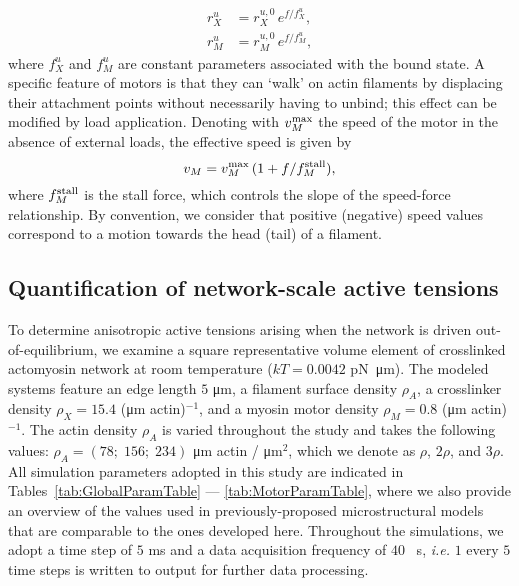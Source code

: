 \begin{equation}\label{eq:BellsLaw}
	\begin{aligned}
		r_X^{u} &= r_X^{u,0} \, e^{f / f_X^u} , \\
		r_M^{u} &= r_M^{u,0} \, e^{f / f_M^u} ,
	\end{aligned}
\end{equation}
where $f_X^u$ and $f_M^u$ are constant parameters associated with the bound state. A specific feature of motors is that they can `walk' on actin filaments by displacing their attachment points without necessarily having to unbind; this effect can be modified by load application. Denoting with $v_M^{\rm max}$ the speed of the motor in the absence of external loads, the effective speed is given by
\begin{equation}\label{eq:MotorSpeed}
	v_M = v_M^{\rm max} \, (1 + f / f_M^{\rm stall}) ,
\end{equation}
where $f_M^{\rm stall}$ is the stall force, which controls the slope of the speed-force relationship. By convention, we consider that positive (negative) speed values correspond to a motion towards the head (tail) of a filament.



\subsection{\label{sec:TractionTests}Quantification of network-scale active tensions}


To determine anisotropic active tensions arising when the network is driven out-of-equilibrium, we examine a square representative volume element of crosslinked actomyosin network at room temperature ($kT = 0.0042$ \si{\pico\newton \micro\meter}). The modeled systems feature an edge length $5$ \si{\micro\meter}, a filament surface density $\rho_A$, a crosslinker density $\rho_X = 15.4$ (\si{\micro\meter} actin)$^{-1}$, and a myosin motor density $\rho_M = 0.8$ (\si{\micro\meter} actin)$^{-1}$. The actin density $\rho_A$ is varied throughout the study and takes the following values: $\rho_A = (78; \; 156; \; 234)$ \si{\micro\meter} actin / \si{\micro\meter}$^{2}$, which we denote  as $\rho$, $2\rho$, and $3\rho$.
All simulation parameters adopted in this study are indicated in Tables~\ref{tab:GlobalParamTable} --- \ref{tab:MotorParamTable}, where we also provide an overview of the values used in previously-proposed microstructural models that are comparable to the ones developed here. Throughout the simulations, we adopt a time step of $5$ \si{\milli\second} and a data acquisition frequency of $40$ \si{\per\second}, \textit{i.e.} $1$ every $5$ time steps is written to output for further data processing.

